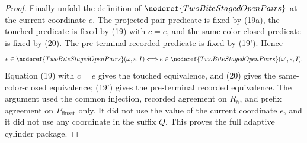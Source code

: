 \begin{proof}
Finally unfold the definition of
\(\noderef{TwoBiteStagedOpenPairs}\) at the current coordinate \(e\).  The
projected-pair predicate is fixed by (19a), the touched
predicate is fixed by (19) with \(c=e\), and the same-color-closed predicate
is fixed by (20).  The pre-terminal recorded predicate is fixed by (19').
Hence
\[
e\in\noderef{TwoBiteStagedOpenPairs}(\omega,\varepsilon,I)
\Longleftrightarrow
e\in\noderef{TwoBiteStagedOpenPairs}(\omega',\varepsilon,I).
\]
Equation (19) with \(c=e\) gives the touched equivalence, and (20) gives the
same-color-closed equivalence; (19') gives the pre-terminal recorded
equivalence.  The argument used the common injection, recorded agreement on
\(R_h\), and prefix agreement on \(P_{\mathrm{finset}}\) only.  It did not use
the value of the current coordinate \(e\), and it did not use any coordinate
in the suffix \(Q\).  This proves the full adaptive cylinder package.
\end{proof}
